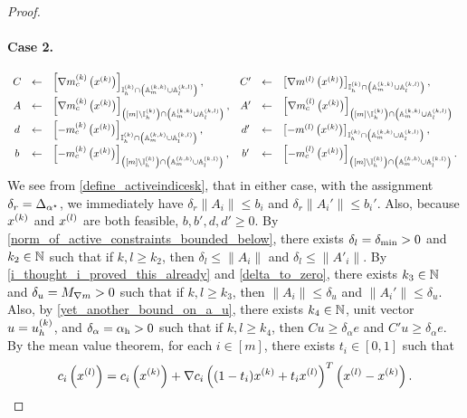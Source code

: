\begin{proof}
\paragraph*{Case 2.}
\begin{align*}
\begin{array}{cclccl}
C  &\gets& \left[\nabla m^{(k)}_c\left(x^{(k)}\right)\right]_{{ \mathbb I_h^{(k)} } \cap \left({\mathbb A_m^{(k, k)}} \cup {\mathbb A_l^{(k, l)}} \right)}, &
C' &\gets& \left[\nabla m^{(l)}\left(x^{(k)}\right)\right]_{{ \mathbb I_h^{(k)} } \cap \left({\mathbb A_m^{(k, k)}} \cup {\mathbb A_l^{(k, l)}} \right)}, \\
A  &\gets& \left[\nabla m^{(k)}_c\left(x^{(k)}\right)\right]_{\left([m] \setminus { \mathbb I_h^{(k)} }\right) \cap \left({\mathbb A_m^{(k, k)}} \cup {\mathbb A_l^{(k, l)}} \right)}, &
A' &\gets& \left[\nabla m^{(l)}_c\left(x^{(k)}\right)\right]_{\left([m] \setminus { \mathbb I_h^{(k)} }\right) \cap \left({\mathbb A_m^{(k, k)}} \cup {\mathbb A_l^{(k, l)}} \right)} \\
d  &\gets& \left[-m^{(k)}_c\left(x^{(k)}\right)\right]_{{ \mathbb I_h^{(k)} } \cap \left({\mathbb A_m^{(k, k)}} \cup {\mathbb A_l^{(k, l)}} \right)}, &
d' &\gets& \left[-m^{(l)}\left(x^{(k)}\right)\right]_{{ \mathbb I_h^{(k)} } \cap \left({\mathbb A_m^{(k, k)}} \cup {\mathbb A_l^{(k, l)}} \right)}, \\
b  &\gets& \left[-m^{(k)}_c\left(x^{(k)}\right)\right]_{\left([m] \setminus { \mathbb I_h^{(k)} }\right) \cap \left({\mathbb A_m^{(k, k)}} \cup {\mathbb A_l^{(k, l)}} \right)}, &
b' &\gets& \left[-m^{(l)}_c\left(x^{(k)}\right)\right]_{\left([m] \setminus { \mathbb I_h^{(k)} }\right) \cap \left({\mathbb A_m^{(k, k)}} \cup {\mathbb A_l^{(k, l)}} \right)}.
\end{array}
\end{align*}
We see from \cref{define_activeindicesk}, that in either case, with the assignment $\delta_r = {\Delta_{\alpha^{\star}}}$, we immediately have 
$\delta_r \|A_i\| \le b_i$ and $\delta_r \|A_i'\| \le b_i'$.
Also, because $x^{(k)}$ and ${x^{(l)}}$ are both feasible, $b, b', d, d' \ge 0$.
By \cref{norm_of_active_constraints_bounded_below}, there exists $\delta_l = {\delta_{\textrm{min}}} > 0$ and $k_2 \in \mathbb N$ such that if $k, l \ge k_2$, then
$\delta_l \le \|A_i\|$ and $\delta_l \le \|A'_i\|$.
By \cref{i_thought_i_proved_this_already} and \cref{delta_to_zero}, there exists $k_3 \in \mathbb N$ and $\delta_u = {M_{\nabla m}} > 0$ such that if $k, l \ge k_3$,
then
$\|A_i\| \le \delta_u$ and $\|A_i'\| \le \delta_u$.
Also, by \cref{yet_another_bound_on_a_u}, there exists $k_4 \in \mathbb N$, unit vector $u = { u_{h}^{(k)} }$, and $\delta_{\alpha} = { \alpha_{\textrm{h}} } > 0$ 
such that if $k, l \ge k_4$, then
$Cu \ge \delta_{\alpha} e$ and $C'u \ge \delta_{\alpha} e$.
By the mean value theorem, for each $i \in [m]$, there exists $t_i \in [0, 1]$ such that
\begin{align*}
c_i\left(\xl\right) = c_i\left(\xk\right) + \nabla c_i\left((1 - t_i)\xk + t_i \xl\right)^T\left(\xl - \xk\right).

\end{align*}
\end{proof}
